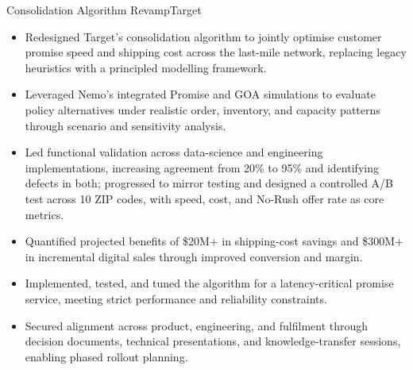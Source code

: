 \documentclass[11pt,a4paper]{moderncv}
\begin{document}
    {Consolidation Algorithm Revamp}{Target}{}{}{
    \begin{itemize}
        \item Redesigned Target's consolidation algorithm to jointly optimise customer promise speed and shipping cost across the last-mile network, replacing legacy heuristics with a principled modelling framework.
        \item Leveraged Nemo's integrated Promise and GOA simulations to evaluate policy alternatives under realistic order, inventory, and capacity patterns through scenario and sensitivity analysis.
        \item Led functional validation across data-science and engineering implementations, increasing agreement from 20\% to 95\% and identifying defects in both; progressed to mirror testing and designed a controlled A/B test across 10 ZIP codes, with speed, cost, and No-Rush offer rate as core metrics.
        \item Quantified projected benefits of \$20M+ in shipping-cost savings and \$300M+ in incremental digital sales through improved conversion and margin.
        \item Implemented, tested, and tuned the algorithm for a latency-critical promise service, meeting strict performance and reliability constraints.
        \item Secured alignment across product, engineering, and fulfilment through decision documents, technical presentations, and knowledge-transfer sessions, enabling phased rollout planning.
    \end{itemize}
    }
\end{document}
